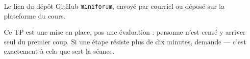 \documentclass[a4paper,11pt]{article}
\begin{document}
\vspace{6pt}
\begin{tcolorbox}[attention, title={À rendre avant la semaine 2}]
Le lien du dépôt GitHub \texttt{miniforum}, envoyé par courriel ou déposé sur la plateforme du cours.
\end{tcolorbox}

\vspace{6pt}
\begin{tcolorbox}[astuce, title={Bloqué ?}]
Ce TP est une mise en place, pas une évaluation : personne n'est censé y arriver seul du premier coup. Si une étape résiste plus de dix minutes, demande --- c'est exactement à cela que sert la séance.
\end{tcolorbox}
\end{document}
